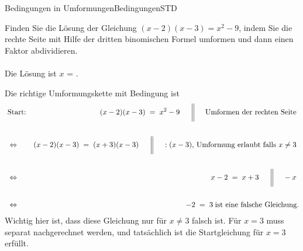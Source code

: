 \begin{MXContent}{Bedingungen in Umformungen}{Bedingungen}{STD}
\begin{MExercise}
Finden Sie die Lösung der Gleichung $(x-2)(x-3)=x^2-9$, indem Sie die rechte Seite mit Hilfe der dritten binomischen Formel umformen und dann einen Faktor abdividieren.
\ \\ \ \\
Die Lösung ist $x$ = .
\ \\
\begin{MHint}{\iSolution}
Die richtige Umformungskette mit Bedingung ist
\begin{eqnarray*}
& \text{Start:} & (x-2)(x-3)\;=\; x^2-9 \ \ \ \ \MSep \ \text{Umformen der rechten Seite} \ \\ \ \\
& \Leftrightarrow & (x-2)(x-3) \;=\; (x+3)(x-3) \ \ \ \ \MSep \ :(x-3)\text{, Umformung erlaubt falls }x\not=3\ \\ \ \\
& \Leftrightarrow & x-2\;=\; x+3 \ \ \ \ \MSep \ -x \ \\ \ \\
& \Leftrightarrow & -2 \;=\; 3 \; \text{ist eine falsche Gleichung.}
\end{eqnarray*}
Wichtig hier ist, dass diese Gleichung nur für $x\not=3$ falsch ist. Für $x=3$ muss separat nachgerechnet werden, und tatsächlich ist die Startgleichung für $x=3$ erfüllt.
\end{MHint}
\end{MExercise}
\end{MXContent}

